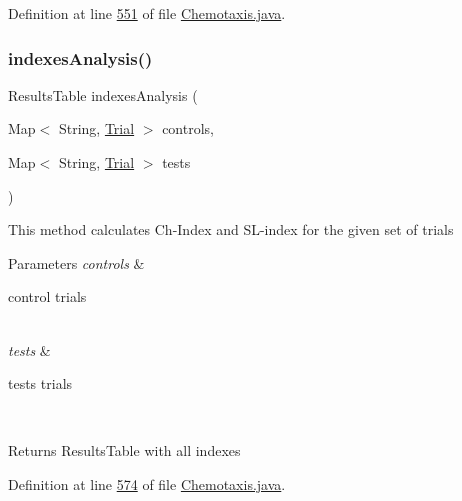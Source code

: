 Definition at line \hyperlink{_chemotaxis_8java_source_l00551}{551} of file \hyperlink{_chemotaxis_8java_source}{Chemotaxis.\+java}.

\hypertarget{classanalysis_1_1_chemotaxis_ae0431b7311aa1bb593e062536734de2c}{}\label{classanalysis_1_1_chemotaxis_ae0431b7311aa1bb593e062536734de2c} 
\subsubsection{\texorpdfstring{indexes\+Analysis()}{indexesAnalysis()}}
{\footnotesize\ttfamily Results\+Table indexes\+Analysis (\begin{DoxyParamCaption}\item[{Map$<$ String, \hyperlink{classdata_1_1_trial}{Trial} $>$}]{controls,  }\item[{Map$<$ String, \hyperlink{classdata_1_1_trial}{Trial} $>$}]{tests }\end{DoxyParamCaption})\hspace{0.3cm}{\ttfamily [private]}}

This method calculates Ch-\/\+Index and S\+L-\/index for the given set of trials


\begin{DoxyParams}{Parameters}
{\em controls} & 
\begin{DoxyItemize}
\item control trials 
\end{DoxyItemize}\\
\hline
{\em tests} & 
\begin{DoxyItemize}
\item tests trials 
\end{DoxyItemize}\\
\hline
\end{DoxyParams}
\begin{DoxyReturn}{Returns}
Results\+Table with all indexes 
\end{DoxyReturn}


Definition at line \hyperlink{_chemotaxis_8java_source_l00574}{574} of file \hyperlink{_chemotaxis_8java_source}{Chemotaxis.\+java}.

\hypertarget{classanalysis_1_1_chemotaxis_a226e01e0b4acab847ec3b2c1bb233740}{}\label{classanalysis_1_1_chemotaxis_a226e01e0b4acab847ec3b2c1bb233740} 
